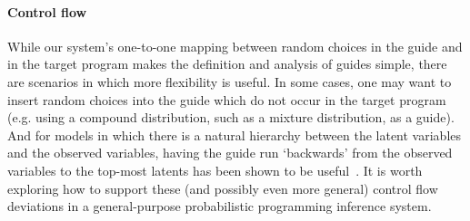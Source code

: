 \paragraph{Control flow}
While our system's one-to-one mapping between random choices in the guide and in the target program makes the definition and analysis of guides simple, there are scenarios in which more flexibility is useful.
In some cases, one may want to insert random choices into the guide which do not occur in the target program (e.g. using a compound distribution, such as a mixture distribution, as a guide).
And for models in which there is a natural hierarchy between the latent variables and the observed variables, having the guide run `backwards' from the observed variables to the top-most latents has been shown to be useful~\cite{StochasticInverses,NeuralStochasticInverses,NVIL}.
It is worth exploring how to support these (and possibly even more general) control flow deviations in a general-purpose probabilistic programming inference system.
